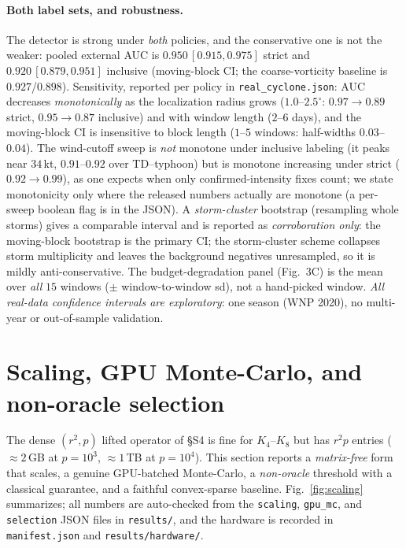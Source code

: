 \documentclass[11pt]{article}
\begin{document}
\paragraph{Both label sets, and robustness.} The detector is strong under
\emph{both} policies, and the conservative one is not the weaker: pooled
external AUC is $0.950\,[0.915,0.975]$ strict and $0.920\,[0.879,0.951]$
inclusive (moving-block CI; the coarse-vorticity baseline is $0.927$/$0.898$).
Sensitivity, reported per policy in \texttt{real\_cyclone.json}: AUC decreases
\emph{monotonically} as the localization radius grows ($1.0$--$2.5^\circ$:
$0.97\!\to\!0.89$ strict, $0.95\!\to\!0.87$ inclusive) and with window length
($2$--$6$ days), and the moving-block CI is insensitive to block length
($1$--$5$ windows: half-widths $0.03$--$0.04$). The wind-cutoff sweep is
\emph{not} monotone under inclusive labeling (it peaks near $34$\,kt,
$0.91$--$0.92$ over TD--typhoon) but is monotone increasing under strict
($0.92\!\to\!0.99$), as one expects when only confirmed-intensity fixes count;
we state monotonicity only where the released numbers actually are monotone (a
per-sweep boolean flag is in the JSON). A \emph{storm-cluster} bootstrap
(resampling whole storms) gives a comparable interval and is reported as
\emph{corroboration only}: the moving-block bootstrap is the primary CI; the
storm-cluster scheme collapses storm multiplicity and leaves the background
negatives unresampled, so it is mildly anti-conservative. The
budget-degradation panel (Fig.~3C) is the mean over \emph{all} $15$ windows
($\pm$ window-to-window sd), not a hand-picked window. \emph{All real-data
confidence intervals are exploratory}: one season (WNP 2020), no multi-year or
out-of-sample validation.

\section{Scaling, GPU Monte-Carlo, and non-oracle selection}\label{sec:scaling}

The dense $(r^2,p)$ lifted operator of \S S4 is fine for $K_4$--$K_8$ but has
$r^2p$ entries ($\approx2$\,GB at $p{=}10^3$, $\approx1$\,TB at $p{=}10^4$).
This section reports a \emph{matrix-free} form that scales, a genuine
GPU-batched Monte-Carlo, a \emph{non-oracle} threshold with a classical
guarantee, and a faithful convex-sparse baseline. Fig.~\ref{fig:scaling}
summarizes; all numbers are auto-checked from the \texttt{scaling},
\texttt{gpu\_mc}, and \texttt{selection} JSON files in \texttt{results/}, and the
hardware is recorded in \texttt{manifest.json} and \texttt{results/hardware/}.
\end{document}
